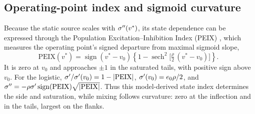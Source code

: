 \subsection{Operating-point index and sigmoid curvature}\label{app:peix}
Because the static source scales with $\sigma''(v^*)$, its state dependence
can be expressed through the Population Excitation--Inhibition Index (PEIX)
\cite{ruffini2025cfc}, which measures the operating point's signed departure from maximal sigmoid slope,
\begin{equation}
\mathrm{PEIX}(v^*)=\operatorname{sign}(v^*-v_0)
\left\{1-\operatorname{sech}^2\!\Big[\tfrac{\rho}{2}\,(v^*-v_0)\Big]\right\}.
\label{eq:peix}
\end{equation}
It is zero at $v_0$ and approaches $\pm1$ in the saturated tails, with
positive sign above $v_0$. For the logistic,
$\sigma'/\sigma'(v_0)=1-|\mathrm{PEIX}|$, $\sigma'(v_0)=e_0\rho/2$, and
$\sigma''=-\rho\sigma'\operatorname{sign}(\mathrm{PEIX})\sqrt{|\mathrm{PEIX}|}$.
Thus this model-derived state index determines the side and saturation, while
mixing follows curvature: zero at the inflection and in the tails, largest
on the flanks.
